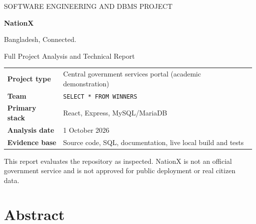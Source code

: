 \documentclass[12pt,a4paper,oneside]{report}
\begin{document}
\begin{titlepage}

\vspace*{2.0cm}
{\color{nationmint}\Large SOFTWARE ENGINEERING AND DBMS PROJECT\par}
\vspace{0.7cm}
{\color{white}\fontsize{42}{48}\selectfont\bfseries NationX\par}
\vspace{0.3cm}
{\color{white}\Huge Bangladesh, Connected.\par}
\vspace{1.2cm}
{\color{white!85}\LARGE Full Project Analysis and Technical Report\par}

\vfill
\begin{tabular}{@{}ll@{}}
\color{nationmint}\textbf{Project type} & \color{white}Central government services portal (academic demonstration)\\
\color{nationmint}\textbf{Team} & \color{white}\texttt{SELECT * FROM WINNERS}\\
\color{nationmint}\textbf{Primary stack} & \color{white}React, Express, MySQL/MariaDB\\
\color{nationmint}\textbf{Analysis date} & \color{white}1 October 2026\\
\color{nationmint}\textbf{Evidence base} & \color{white}Source code, SQL, documentation, live local build and tests\\
\end{tabular}
\vspace{2.7cm}

{\color{white!65}\small This report evaluates the repository as inspected. NationX is not an official
government service and is not approved for public deployment or real citizen data.\par}
\end{titlepage}

\chapter*{Abstract}
\end{document}
